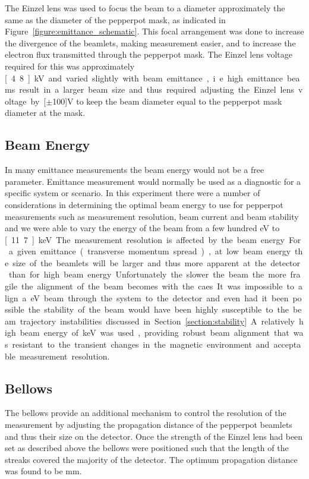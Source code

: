 The Einzel lens was used to focus the beam to a diameter approximately the same as the diameter of the pepperpot mask, as indicated in Figure~\ref{figure:emittance_schematic}.
This focal arrangement was done to increase the divergence of the beamlets, making measurement easier, and to increase the electron flux transmitted through the pepperpot mask.
The Einzel lens voltage required for this was approximately \unit[4.8]{kV} and varied slightly with beam emittance, i.e. high emittance beams result in a larger beam size and thus required adjusting the Einzel lens voltage by \unit[$\pm$100]{V} to keep the beam diameter equal to the pepperpot mask diameter at the mask.

\subsection{Beam Energy}
In many emittance measurements the beam energy would not be a free parameter.
Emittance measurement would normally be used as a diagnostic for a specific system or scenario.
In this experiment there were a number of considerations in determining the optimal beam energy to use for pepperpot measurements such as measurement resolution, beam current and beam stability and we were able to vary the energy of the beam from a few hundred eV to \unit[11.7]{keV}.


The measurement resolution is affected by the beam energy.
For a given emittance (transverse momentum spread), at low beam energy the size of the beamlets will be larger and thus more apparent at the detector than for high beam energy.
Unfortunately the slower the beam the more fragile the alignment of the beam becomes with the \gls{caes}.
It was impossible to align a \unit[500]{eV} beam through the system to the detector and even had it been possible the stability of the beam would have been highly susceptible to the beam trajectory instabilities discussed in Section~\ref{section:stability}.
A relatively high beam energy of \unit[8]{keV} was used, providing robust beam alignment that was resistant to the transient changes in the magnetic environment and acceptable measurement resolution.

\subsection{Bellows}

The bellows provide an additional mechanism to control the resolution of the measurement by adjusting the propagation distance of the pepperpot beamlets and thus their size on the detector.
Once the strength of the Einzel lens had been set as described above the bellows were positioned such that the length of the streaks covered the majority of the detector.
The optimum propagation distance was found to be \unit[475]{mm}.

